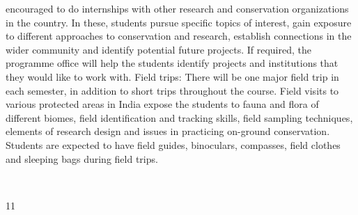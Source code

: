 \documentclass[a4paper,10pt]{article}
\begin{document}
encouraged to do internships with other research and conservation organizations in the
country. In these, students pursue specific topics of interest, gain exposure to different
approaches to conservation and research, establish connections in the wider community and
identify potential future projects. If required, the programme office will help the students
identify projects and institutions that they would like to work with.
Field trips: There will be one major field trip in each semester, in addition to short trips
throughout the course. Field visits to various protected areas in India expose the students to
fauna and flora of different biomes, field identification and tracking skills, field sampling
techniques, elements of research design and issues in practicing on-ground conservation.
Students are expected to have field guides, binoculars, compasses, field clothes and sleeping
bags during field trips.

	
  

11	
  
\end{document}
